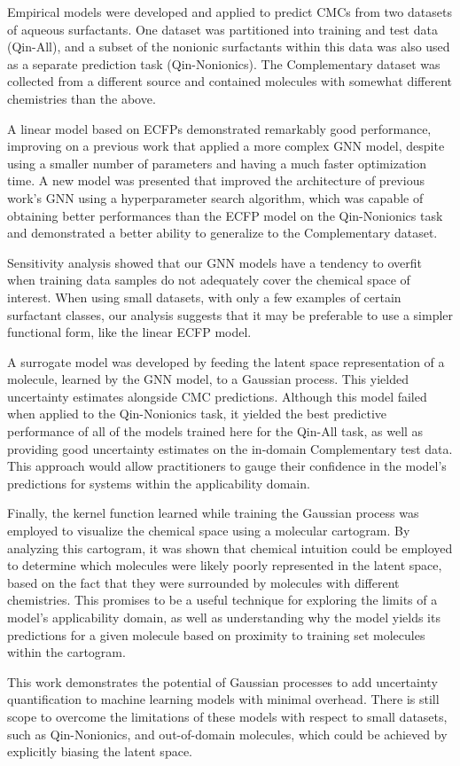 Empirical models were developed and applied to predict CMCs from two datasets of
aqueous surfactants. One dataset was partitioned into training and test data
(Qin-All), and a subset of the nonionic surfactants within this data was also
used as a separate prediction task (Qin-Nonionics). The Complementary dataset was
collected from a different source and contained molecules with somewhat
different chemistries than the above.

A linear model based on ECFPs demonstrated remarkably good performance,
improving on a previous work \cite{qinPredictingCriticalMicelle2021} that
applied a more complex GNN model, despite using a smaller number of parameters
and having a much faster optimization time. A new model was presented that
improved the architecture of previous work's GNN using a hyperparameter search
algorithm, which was capable of obtaining better performances than the ECFP
model on the Qin-Nonionics task and demonstrated a better ability to generalize
to the Complementary dataset.

Sensitivity analysis showed that our GNN models have a tendency to overfit when
training data samples do not adequately cover the chemical space of interest.
When using small datasets, with only a few examples of certain surfactant
classes, our analysis suggests that it may be preferable to use a simpler
functional form, like the linear ECFP model.

A surrogate model was developed by feeding the latent space representation of a
molecule, learned by the GNN model, to a Gaussian process. This yielded
uncertainty estimates alongside CMC predictions. Although this model failed when
applied to the Qin-Nonionics task, it yielded the best predictive performance of
all of the models trained here for the Qin-All task, as well as providing good
uncertainty estimates on the in-domain Complementary test data. This approach would allow
practitioners to gauge their confidence in the model's predictions for systems
within the applicability domain.

Finally, the kernel function learned while training the Gaussian process was
employed to visualize the chemical space using a molecular cartogram. By
analyzing this cartogram, it was shown that chemical intuition could be employed
to determine which molecules were likely poorly represented in the latent space,
based on the fact that they were surrounded by molecules with different
chemistries. This promises to be a useful technique for exploring the limits of
a model's applicability domain, as well as understanding why the model yields
its predictions for a given molecule based on proximity to training set
molecules within the cartogram.

This work demonstrates the potential of Gaussian processes to add uncertainty
quantification to machine learning models with minimal overhead. There is still
scope to overcome the limitations of these models with respect to small
datasets, such as Qin-Nonionics, and out-of-domain molecules, which could be
achieved by explicitly biasing the latent space.